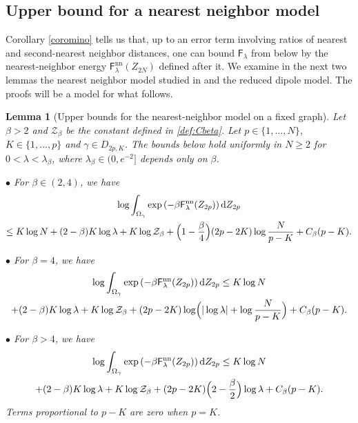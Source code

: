 \documentclass[a4paper,10pt,leqno]{amsart}
\numberwithin{equation}{section}
\newtheorem{lem}[prop]{Lemma}
\newcommand{\dd}{\mathrm{d}}
\def\mc{\mathcal}
\def\F{\mathsf{F}}
\def\nn{\mathrm{nn}}
\begin{document}
\subsection{Upper bound for a nearest neighbor model}

Corollary \ref{coromino} tells us that, up to an error term involving ratios of nearest and second-nearest neighbor distances, one can bound $\F_\lambda$ from below by the nearest-neighbor energy $\F_\lambda^\nn(Z_{2N})$ defined after it.
We examine in the next two lemmas the nearest neighbor model studied in \cite{GunPan} and the reduced dipole model. The proofs will be a model for what follows.

\begin{lem}[Upper bounds for the nearest-neighbor model on a fixed graph]\label{lemma:nearest neigh}
  Let $\beta>2$ and $\mathcal Z_\beta$ be the constant defined in \eqref{def:Cbeta}. Let $p\in \{1,\ldots,N\}$, $K\in \{1,\ldots,p\}$ and $\gamma\in D_{2p,K}$. The bounds below hold uniformly in $N\ge2$ for $0<\lambda<\lambda_\beta$, where $\lambda_\beta\in(0,e^{-2}]$ depends only on $\beta$.

  $\bullet$ For $\beta\in (2,4)$, we have
  \begin{multline*}
    \log \int_{\Omega_\gamma} \exp\left(-\beta \F_\lambda^{\nn}(Z_{2p})\right) \dd Z_{2p} \\ \leq K \log N
    + (2-\beta)K\log\lambda+K \log \mathcal Z_{\beta}+\Bigl(1-\frac{\beta}{4}\Bigr)(2p-2K)\log \frac{N}{p-K}+C_\beta(p-K).
  \end{multline*}

  $\bullet$ For $\beta=4$, we have
  \begin{multline*}
    \log \int_{\Omega_\gamma} \exp\left(-\beta \F_\lambda^{\nn}(Z_{2p})\right) \dd Z_{2p} \leq K \log N
    \\ +(2-\beta)K\log \lambda+K\log \mc{Z}_\beta+ (2p-2K)\log\Bigl(|\log \lambda|+\log \frac{N}{p-K}\Bigr)+C_\beta(p-K).
  \end{multline*}

  $\bullet$ For $\beta>4$, we have
  \begin{multline*}
    \log \int_{\Omega_\gamma} \exp\left(-\beta \F_\lambda^{\nn}(Z_{2p})\right) \dd Z_{2p}
    \leq K \log N \\ +(2-\beta)K\log \lambda+K\log \mc{Z}_\beta+(2p-2K)\Bigl(2-\frac{\beta}{2}\Bigr)\log \lambda+C_\beta(p-K).
  \end{multline*}
  Terms proportional to $p-K$ are zero when $p=K$.
\end{lem}
\end{document}
